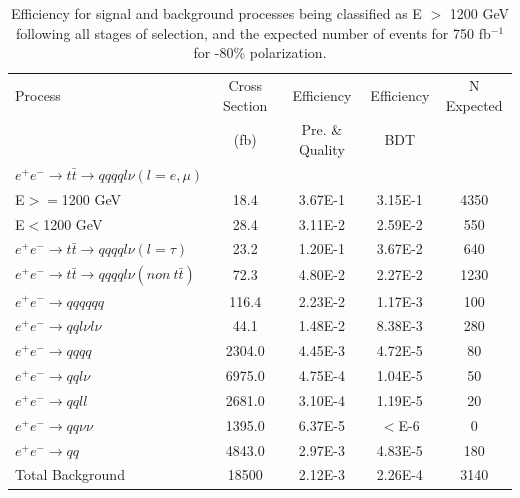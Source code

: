 \begin{table}
  \centering
  \begin{tabular}{l | c | c | c | c}
    \toprule
     Process     & Cross Section & Efficiency & Efficiency & N Expected\\
     & (fb) & Pre. \& Quality & BDT & \\
     \midrule
    $e^+e^-\rightarrow t\bar{t} \rightarrow qqqql\nu (l=e,\mu)$&  &  & &\\
     E$>=$1200 GeV & 18.4 & 3.67E-1 & 3.15E-1 & 4350\\
     E$<$1200 GeV & 28.4 & 3.11E-2 & 2.59E-2 & 550 \\
    \midrule
    $e^+e^-\rightarrow t\bar{t} \rightarrow qqqql\nu (l=\tau)$& 23.2 & 1.20E-1 & 3.67E-2 & 640 \\
    \midrule
    $e^+e^-\rightarrow t\bar{t} \rightarrow qqqql\nu (non ~ t\bar{t})$& 72.3 & 4.80E-2 & 2.27E-2 & 1230\\
    \midrule
    $e^+e^-\rightarrow qqqqqq$ & 116.4 &  2.23E-2 &1.17E-3 & 100 \\
    \midrule
    $e^+e^-\rightarrow qql\nu l\nu$ & 44.1 & 1.48E-2 & 8.38E-3 & 280\\
    \midrule
    $e^+e^-\rightarrow qqqq$ & 2304.0 & 4.45E-3 & 4.72E-5 & 80 \\
    \midrule
    $e^+e^-\rightarrow qql\nu$ & 6975.0 & 4.75E-4 & 1.04E-5 & 50 \\
    \midrule
    $e^+e^-\rightarrow qqll$ & 2681.0 & 3.10E-4 & 1.19E-5 & 20 \\
    \midrule
    $e^+e^-\rightarrow qq\nu\nu$ & 1395.0 & 6.37E-5 & $<$E-6 & 0 \\
    \midrule
    $e^+e^-\rightarrow qq$ & 4843.0 & 2.97E-3 & 4.83E-5 & 180\\
    \midrule
    \midrule
    Total Background & 18500 & 2.12E-3 & 2.26E-4 & 3140 \\
    \bottomrule
  \end{tabular}
  \caption{Efficiency for signal and background processes being classified as E $>$ 1200 GeV following all stages of selection, and the expected number of events for 750 fb$^{-1}$ for -80\% polarization.}
  \label{table:topfinalefficienciesneg}
\end{table}

